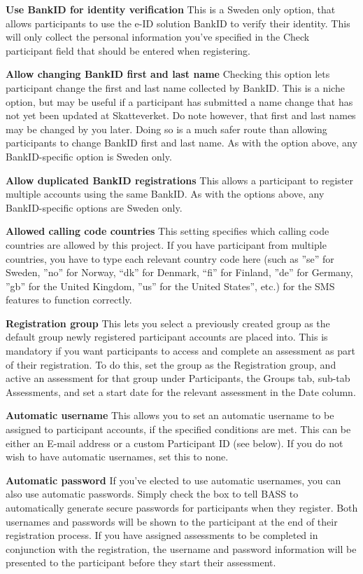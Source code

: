 \documentclass[]{book}
\begin{document}
\textbf{Use BankID for identity verification}
This is a Sweden only option, that allows participants to use the e-ID solution BankID to verify their identity. This will only collect the personal information you've specified in the Check participant field that should be entered when registering.

\textbf{Allow changing BankID first and last name}
Checking this option lets participant change the first and last name collected by BankID. This is a niche option, but may be useful if a participant has submitted a name change that has not yet been updated at Skatteverket. Do note however, that first and last names may be changed by you later. Doing so is a much safer route than allowing participants to change BankID first and last name. As with the option above, any BankID-specific option is Sweden only.

\textbf{Allow duplicated BankID registrations}
This allows a participant to register multiple accounts using the same BankID. As with the options above, any BankID-specific options are Sweden only.

\textbf{Allowed calling code countries}
This setting specifies which calling code countries are allowed by this project. If you have participant from multiple countries, you have to type each relevant country code here (such as ''se'' for Sweden, ''no'' for Norway, ``dk'' for Denmark, ``fi'' for Finland, ''de'' for Germany, ''gb'' for the United Kingdom, ''us'' for the United States'', etc.) for the SMS features to function correctly.

\textbf{Registration group}
This lets you select a previously created group as the default group newly registered participant accounts are placed into. This is mandatory if you want participants to access and complete an assessment as part of their registration.
To do this, set the group as the Registration group, and active an assessment for that group under Participants, the Groups tab, sub-tab Assessments, and set a start date for the relevant assessment in the Date column.

\textbf{Automatic username}
This allows you to set an automatic username to be assigned to participant accounts, if the specified conditions are met. This can be either an E-mail address or a custom Participant ID (see below). If you do not wish to have automatic usernames, set this to none.

\textbf{Automatic password}
If you've elected to use automatic usernames, you can also use automatic passwords. Simply check the box to tell BASS to automatically generate secure passwords for participants when they register. Both usernames and passwords will be shown to the participant at the end of their registration process. If you have assigned assessments to be completed in conjunction with the registration, the username and password information will be presented to the participant before they start their assessment.
\end{document}
